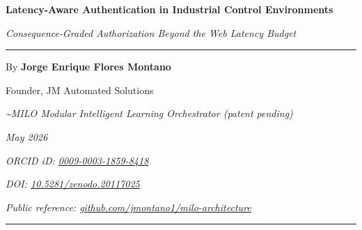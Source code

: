 \documentclass[11pt,letterpaper,oneside]{article}
\newcommand{\milotitle}{Latency-Aware Authentication in Industrial Control Environments}
\newcommand{\milosubtitle}{Consequence-Graded Authorization Beyond the Web Latency Budget}
\newcommand{\milodate}{May 2026}
\begin{document}
\thispagestyle{titlepage}
\begin{center}
\vspace*{0.2in}
{\sffamily\Large\bfseries\color{milonavy} \milotitle\par}
\vspace{0.15in}
{\itshape\normalsize \milosubtitle\par}
\vspace{0.18in}
{\color{milonavy}\rule{0.35\textwidth}{0.8pt}\par}
\vspace{0.18in}
{\large By \textbf{Jorge Enrique Flores Montano}\par}
{\normalsize Founder, JM Automated Solutions\par}
{\small\itshape\textcolor{black!70}{\textasciitilde MILO\texttrademark{} \textemdash{} Modular Intelligent Learning Orchestrator (patent pending)}\par}
{\small\itshape\textcolor{black!70}{\milodate}\par}
{\small\itshape\textcolor{black!70}{ORCID iD: \href{https://orcid.org/0009-0003-1859-8418}{0009-0003-1859-8418}}\par}
{\small\itshape\textcolor{black!70}{DOI: \href{https://doi.org/10.5281/zenodo.20117025}{10.5281/zenodo.20117025}}\par}
{\small\itshape\textcolor{black!70}{Public reference: \href{https://github.com/jmontano1/milo-architecture}{github.com/jmontano1/milo-architecture}}\par}
\vspace{0.15in}
{\color{milonavy}\rule{\textwidth}{0.6pt}\par}
\end{center}


\end{document}
